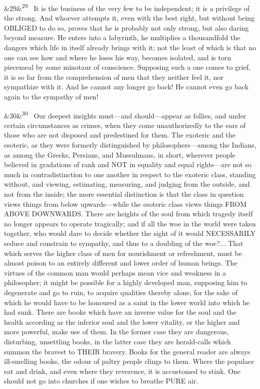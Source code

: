 \documentclass[12pt]{article}
\newcommand{\para}[1][]{\par\noindent\ifx&#1&\else\textsuperscript{\footnotesize #1}~\fi}
\begin{document}
\para[29] It is the business of the very few to be independent; it is a privilege of the strong. And whoever attempts it, even with the best right, but without being OBLIGED to do so, proves that he is probably not only strong, but also daring beyond measure. He enters into a labyrinth, he multiplies a thousandfold the dangers which life in itself already brings with it; not the least of which is that no one can see how and where he loses his way, becomes isolated, and is torn piecemeal by some minotaur of conscience. Supposing such a one comes to grief, it is so far from the comprehension of men that they neither feel it, nor sympathize with it. And he cannot any longer go back! He cannot even go back again to the sympathy of men!

\para[30] Our deepest insights must---and should---appear as follies, and under certain circumstances as crimes, when they come unauthorizedly to the ears of those who are not disposed and predestined for them. The exoteric and the esoteric, as they were formerly distinguished by philosophers---among the Indians, as among the Greeks, Persians, and Mussulmans, in short, wherever people believed in gradations of rank and NOT in equality and equal rights---are not so much in contradistinction to one another in respect to the exoteric class, standing without, and viewing, estimating, measuring, and judging from the outside, and not from the inside; the more essential distinction is that the class in question views things from below upwards---while the esoteric class views things FROM ABOVE DOWNWARDS. There are heights of the soul from which tragedy itself no longer appears to operate tragically; and if all the woe in the world were taken together, who would dare to decide whether the sight of it would NECESSARILY seduce and constrain to sympathy, and thus to a doubling of the woe?... That which serves the higher class of men for nourishment or refreshment, must be almost poison to an entirely different and lower order of human beings. The virtues of the common man would perhaps mean vice and weakness in a philosopher; it might be possible for a highly developed man, supposing him to degenerate and go to ruin, to acquire qualities thereby alone, for the sake of which he would have to be honoured as a saint in the lower world into which he had sunk. There are books which have an inverse value for the soul and the health according as the inferior soul and the lower vitality, or the higher and more powerful, make use of them. In the former case they are dangerous, disturbing, unsettling books, in the latter case they are herald-calls which summon the bravest to THEIR bravery. Books for the general reader are always ill-smelling books, the odour of paltry people clings to them. Where the populace eat and drink, and even where they reverence, it is accustomed to stink. One should not go into churches if one wishes to breathe PURE air.
\end{document}
